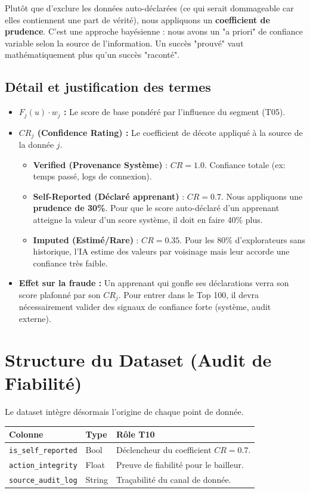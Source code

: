 \documentclass[11pt,a4paper]{article}
\begin{document}
Plutôt que d'exclure les données auto-déclarées (ce qui serait dommageable car elles contiennent une part de vérité), nous appliquons un \textbf{coefficient de prudence}. C'est une approche bayésienne : nous avons un "a priori" de confiance variable selon la source de l'information. Un succès "prouvé" vaut mathématiquement plus qu'un succès "raconté".

\subsection{Détail et justification des termes}
\begin{itemize}
    \item \textbf{$F_j(u) \cdot w_j$ :} Le score de base pondéré par l'influence du segment (T05).
    
    \item \textbf{$CR_j$ (Confidence Rating) :} Le coefficient de décote appliqué à la source de la donnée $j$.
    \begin{itemize}
        \item \textbf{Verified (Provenance Système)} : $CR = 1.0$. Confiance totale (ex: temps passé, logs de connexion).
        \item \textbf{Self-Reported (Déclaré apprenant)} : $CR = 0.7$. Nous appliquons une \textbf{prudence de 30\%}. Pour que le score auto-déclaré d'un apprenant atteigne la valeur d'un score système, il doit en faire 40\% plus.
        \item \textbf{Imputed (Estimé/Rare)} : $CR = 0.35$. Pour les 80\% d'explorateurs sans historique, l'IA estime des valeurs par voisinage mais leur accorde une confiance très faible.
    \end{itemize}

    \item \textbf{Effet sur la fraude :} Un apprenant qui gonfle ses déclarations verra son score plafonné par son $CR_j$. Pour entrer dans le Top 100, il devra nécessairement valider des signaux de confiance forte (système, audit externe).
\end{itemize}

\section{Structure du Dataset (Audit de Fiabilité)}
Le dataset intègre désormais l'origine de chaque point de donnée.
\begin{table}[h!]
\centering
\begin{tabular}{|l|l|p{7cm}|}
\hline
\rowcolor{BrandDark} \color{white} Colonne & \color{white} Type & \color{white} Rôle T10 \\ \hline
\texttt{is\_self\_reported} & Bool & Déclencheur du coefficient $CR = 0.7$. \\ \hline
\rowcolor{BrandPrimary!20} \texttt{action\_integrity} & Float & Preuve de fiabilité pour le bailleur. \\ \hline
\texttt{source\_audit\_log} & String & Traçabilité du canal de donnée. \\ \hline
\end{tabular}
\end{table}
\end{document}
